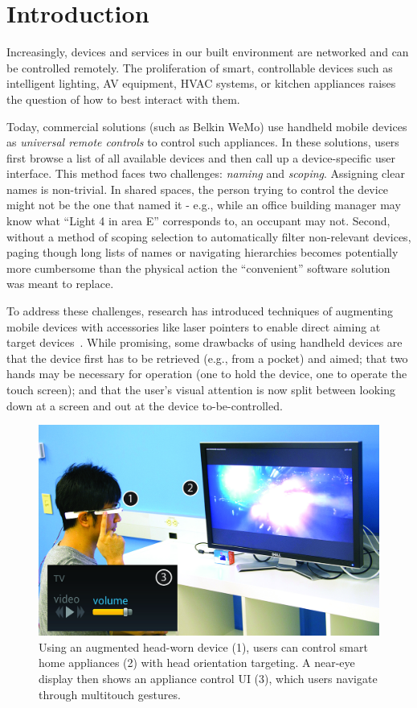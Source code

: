 \section{Introduction}
Increasingly, devices and services in our built environment are networked and can be controlled remotely. The proliferation of smart, controllable devices such as intelligent lighting, AV equipment, HVAC systems, or kitchen appliances raises the question of how to best interact with them. 

Today, commercial solutions (such as Belkin WeMo) use handheld mobile devices as {\em universal remote controls} to control such appliances. In these solutions, users first browse a list of all available devices and then call up a device-specific user interface. This method faces two challenges: {\em naming} and {\em scoping}. Assigning clear names is non-trivial. In shared spaces, the person trying to control the device might not be the one that named it - e.g., while an office building manager may know what ``Light 4 in area E'' corresponds to, an occupant may not. Second, without a method of scoping selection to automatically filter non-relevant devices, paging though long lists of names or navigating hierarchies becomes potentially more cumbersome than the physical action the ``convenient'' software solution was meant to replace.

To address these challenges, research has introduced techniques of augmenting mobile devices with accessories like laser pointers to enable direct aiming at target devices~\cite{beigl_point_1999,patel_2-way_2003}. While promising, some drawbacks of using handheld devices are that the device first has to be retrieved (e.g., from a pocket) and aimed; that two hands may be necessary for operation (one to hold the device, one to operate the touch screen); and that the user's visual attention is now split between looking down at a screen and out at the device to-be-controlled. 

\begin{figure}[t]
\centering
\includegraphics[width=1.0\columnwidth]{figures/teaser.jpg}
\caption{Using an augmented head-worn device (1), users can control smart home appliances (2) with head orientation targeting. A near-eye display then shows an appliance control UI (3), which users navigate through multitouch gestures.}
\label{fig:teaser}
\end{figure}

